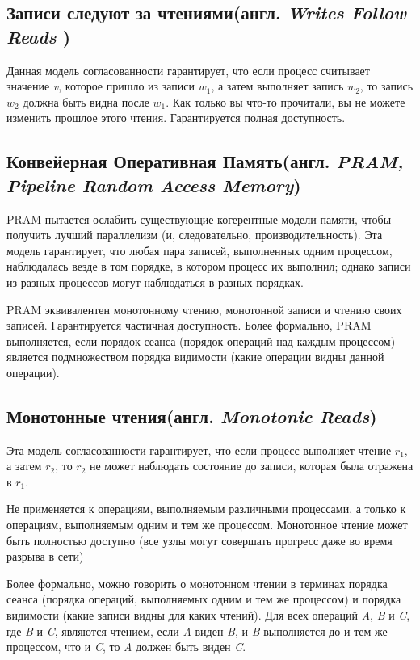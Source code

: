 \documentclass[12pt,  openany]{book}
\begin{document}
\subsection{Записи следуют за чтениями(англ.  \textit{Writes Follow Reads })}
Данная модель согласованности гарантирует, что если процесс считывает значение \textit{v}, которое пришло из записи $w_1$, а затем выполняет запись $w_2$, то запись $w_2$ должна быть видна после $w_1$. Как только вы что-то прочитали, вы не можете изменить прошлое этого чтения. Гарантируется полная доступность.

\subsection{Конвейерная Оперативная Память(англ.  \textit{PRAM, Pipeline Random Access Memory})}
PRAM пытается ослабить существующие когерентные модели памяти, чтобы получить лучший параллелизм (и, следовательно, производительность). Эта модель гарантирует, что любая пара записей, выполненных одним процессом, наблюдалась везде в том порядке, в котором процесс их выполнил; однако записи из разных процессов могут наблюдаться в разных порядках. 
\par
PRAM эквивалентен монотонному чтению, монотонной записи и чтению своих записей.
Гарантируется частичная доступность.
Более формально, PRAM выполняется, если порядок сеанса (порядок операций над каждым процессом) является подмножеством порядка видимости (какие операции видны данной операции).

\subsection{Монотонные чтения(англ.  \textit{Monotonic Reads})}
Эта модель согласованности гарантирует, что если процесс выполняет чтение $r_1$, а затем $r_2$, то $r_2$ не может наблюдать состояние до записи, которая была отражена в $r_1$.
\par
Не применяется к операциям, выполняемым различными процессами, а только к операциям, выполняемым одним и тем же процессом. Монотонное чтение может быть полностью доступно (все узлы могут совершать прогресс даже во время разрыва в сети)
\par
Более формально, можно говорить о монотонном чтении в терминах порядка сеанса (порядка операций, выполняемых одним и тем же процессом) и порядка видимости (какие записи видны для каких чтений). Для всех операций \textit{A}, \textit{B} и \textit{C}, где \textit{B}  и \textit{C}, являются чтением, если \textit{A} виден \textit{B}, и \textit{B} выполняется до и тем же процессом, что и \textit{C}, то \textit{A} должен быть виден \textit{C}.
\end{document}
